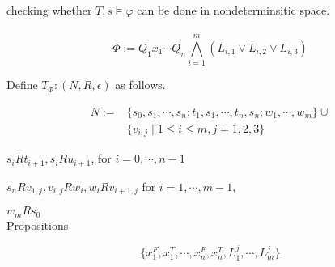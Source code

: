 \documentclass[12pt]{article}
\begin{document}
checking whether $T,s\models \varphi$ can be done in nondeterminsitic space. 
\\ \ \\





$$\Phi:=Q_1x_1\cdots Q_n\bigwedge_{i=1}^m \left(L_{i,1}\vee L_{i,2}\vee L_{i,3}\right)$$

Define $T_{\Phi}:(N,R,\epsilon)$ as follows.


$$\begin{array}{ll}N:=&
\{s_0, s_1,\cdots, s_n; t_1,s_1,\cdots, t_n,s_n; w_1,\cdots, w_m\}\cup\\ & \{v_{i,j}\mid 1\leq i\leq m, j=1,2,3\}\end{array}$$


$s_iR t_{i+1}, s_iRu_{i+1}$, for $i=0,\cdots,n-1$

$s_nR v_{1,j}, v_{i,j}Rw_i, w_iRv_{i+1,j}$ for $i=1,\cdots,m-1$, 

$w_mRs_0$ \\


Propositions

$$\{x_1^F, x_1^T, \cdots, x_n^F, x_n^T, L_1^j,\cdots, L_m^j\}$$


















 
\end{document}
